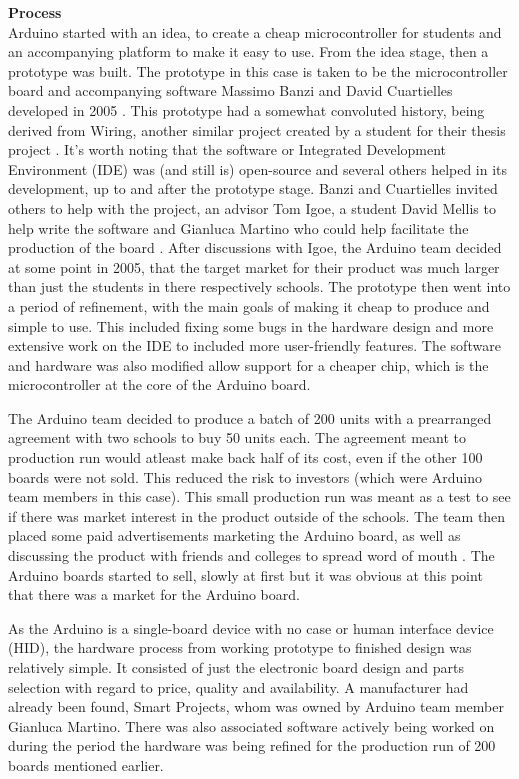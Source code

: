 \textbf{Process}\\
Arduino started with an idea, to create a cheap microcontroller for students and an accompanying platform to make it easy to use. From the idea stage, then a prototype was built. The prototype in this case is taken to be the microcontroller board and accompanying software Massimo Banzi and David Cuartielles developed in 2005 
\cite{RN111}. This prototype had a somewhat convoluted history, being derived from Wiring, another similar project created by a student for their thesis project 
\cite{RN110}\cite{RN111}. It's worth noting that the software or Integrated Development Environment (IDE) was (and still is) open-source and several others helped in its development, up to and after the prototype stage. Banzi and Cuartielles invited others to help with the project, an advisor Tom Igoe, a student David Mellis to help write the software and Gianluca Martino who could help facilitate the production of the board 
\cite{RN111}. After discussions with Igoe, the Arduino team decided at some point in 2005, that the target market for their product was much larger than just the students in there respectively schools. The prototype then went into a period of refinement, with the main goals of making it cheap to produce and simple to use. This included fixing some bugs in the hardware design 
\cite{RN111} and more extensive work on the IDE to included more user-friendly features. The software and hardware was also modified allow support for a cheaper chip, which is the microcontroller at the core of the Arduino board.

The Arduino team decided to produce a batch of 200 units with a prearranged agreement with two schools to buy 50 units each. The agreement meant to production run would atleast make back half of its cost, even if the other 100 boards were not sold. This reduced the risk to investors (which were Arduino team members in this case). This small production run was meant as a test to see if there was market interest in the product outside of the schools. The team then placed some paid advertisements marketing the Arduino board, as well as discussing the product with friends and colleges to spread word of mouth 
\cite{RN111}. The Arduino boards started to sell, slowly at first but it was obvious at this point that there was a market for the Arduino board.

As the Arduino is a single-board device with no case or human interface device (HID), the hardware process from working prototype to finished design was relatively simple. It consisted of just the electronic board design and parts selection with regard to price, quality and availability. A manufacturer had already been found, Smart Projects, whom was owned by Arduino team member Gianluca Martino. There was also associated software actively being worked on during the period the hardware was being refined for the production run of 200 boards mentioned earlier.


